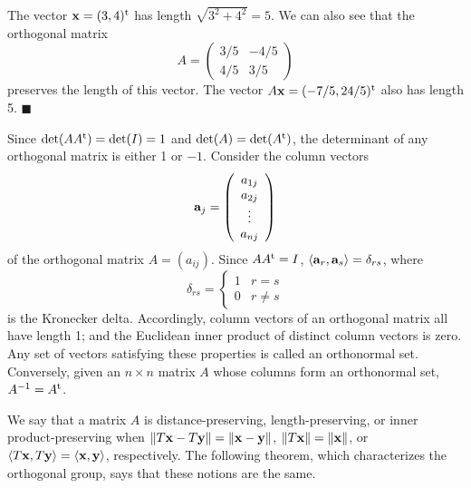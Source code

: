  
The vector ${\bold x} =(3,4)^{\rm t}$ has length $\sqrt{3^2 + 4^2} = 5$.  We
can also see that the orthogonal matrix 
\[
A=
\left(
\begin{array}{cc}
3/5 & -4/5 \\
4/5 & 3/5
\end{array}
\right)
\]
preserves the length of this vector. The vector $A{\bold x} =
(-7/5,24/5)^{\rm t}$ also has length 5. 
\hspace{\fill} $\blacksquare$
 
 
\vspace{1.5ex}
 
 
Since $\det(A A^{\rm t}) = \det(I) = 1$ and $\det(A) = \det( A^{\rm t}
)$, the determinant of any orthogonal matrix is either 1 or $-1$.
Consider the column vectors 
\[
{\bold a}_j
=
\left(
\begin{array}{c}
a_{1j} \\
a_{2j} \\
\vdots \\
a_{nj}
\end{array}
\right)
\]
of the orthogonal matrix
$A= (a_{ij})$. Since
$AA^{\rm t} = I$,
$\langle {\bold a}_r, {\bold a}_s \rangle = \delta_{rs}$,
where
\[
\delta_{rs}
=
\left\{
\begin{array}{cc}
1 & r = s \\
0 & r \neq s
\end{array}
\right.
\]
is the Kronecker delta. Accordingly, column
vectors of an orthogonal matrix all have length 1; and the Euclidean
inner product of distinct column vectors is zero. Any set of vectors
satisfying these properties is called an {\bfi orthonormal
set}. Conversely, given an $n \times n$ matrix
$A$ whose columns form an orthonormal set, $A^{-1} = A^{\rm t}$.
 
 
We say that a matrix $A$ is {\bfi
distance-preserving}, {\bfi
length-preserving}, or {\bfi inner
product-preserving\/} when $\|
T{\bold x}- T{\bold y} \| =\| {\bold x}- {\bold y} \|$, $\| T{\bold x}
\| =\| {\bold x} \|$, or $\langle  T{\bold x}, T{\bold y} \rangle =
\langle {\bold x},{\bold y} \rangle$, respectively. The following
theorem, which characterizes the orthogonal group, says that these
notions are the same.
 
